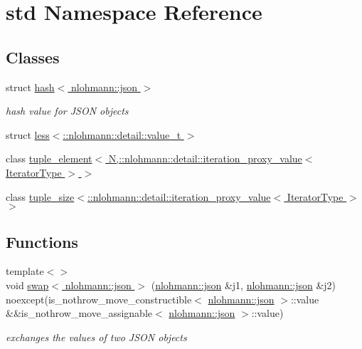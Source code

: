 \hypertarget{namespacestd}{}\section{std Namespace Reference}
\label{namespacestd}
\subsection*{Classes}
\begin{DoxyCompactItemize}
\item 
struct \hyperlink{structstd_1_1hash_3_01nlohmann_1_1json_01_4}{hash$<$ nlohmann\+::json $>$}
\begin{DoxyCompactList}\small\item\em hash value for J\+S\+ON objects \end{DoxyCompactList}\item 
struct \hyperlink{structstd_1_1less_3_1_1nlohmann_1_1detail_1_1value__t_01_4}{less$<$\+::nlohmann\+::detail\+::value\+\_\+t $>$}
\item 
class \hyperlink{classstd_1_1tuple__element_3_01N_00_1_1nlohmann_1_1detail_1_1iteration__proxy__value_3_01IteratorType_01_4_01_4}{tuple\+\_\+element$<$ N,\+::nlohmann\+::detail\+::iteration\+\_\+proxy\+\_\+value$<$ Iterator\+Type $>$ $>$}
\item 
class \hyperlink{classstd_1_1tuple__size_3_1_1nlohmann_1_1detail_1_1iteration__proxy__value_3_01IteratorType_01_4_01_4}{tuple\+\_\+size$<$\+::nlohmann\+::detail\+::iteration\+\_\+proxy\+\_\+value$<$ Iterator\+Type $>$ $>$}
\end{DoxyCompactItemize}
\subsection*{Functions}
\begin{DoxyCompactItemize}
\item 
{\footnotesize template$<$$>$ }\\void \hyperlink{namespacestd_a98707c82ac7d5ca28f86b7114d69df79}{swap$<$ nlohmann\+::json $>$} (\hyperlink{namespacenlohmann_a2bfd99e845a2e5cd90aeaf1b1431f474}{nlohmann\+::json} \&j1, \hyperlink{namespacenlohmann_a2bfd99e845a2e5cd90aeaf1b1431f474}{nlohmann\+::json} \&j2) noexcept(is\+\_\+nothrow\+\_\+move\+\_\+constructible$<$ \hyperlink{namespacenlohmann_a2bfd99e845a2e5cd90aeaf1b1431f474}{nlohmann\+::json} $>$\+::value \&\&is\+\_\+nothrow\+\_\+move\+\_\+assignable$<$ \hyperlink{namespacenlohmann_a2bfd99e845a2e5cd90aeaf1b1431f474}{nlohmann\+::json} $>$\+::value)
\begin{DoxyCompactList}\small\item\em exchanges the values of two J\+S\+ON objects \end{DoxyCompactList}\end{DoxyCompactItemize}


